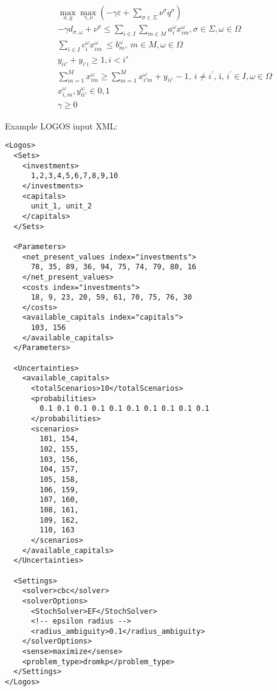\vst {}
\begin{subequations}\label{DROMKP}
\begin{eqnarray}
& & \max_{x, y} \max_{\gamma, \nu} (-\gamma \varepsilon + \sum_{\sigma \in \Sigma} \nu^\sigma q^\sigma)  \\
& &  -\gamma d_{\sigma, \omega} + \nu^\sigma \le \sum _{i \in I} \sum _{m \in M}a_{i}^{ \omega }x_{im}^{ \omega }, \sigma \in \Sigma, \omega \in \Omega \\
& & \sum _{i \in I}^{} c_{i}^{ \omega }x_{im}^{ \omega }~  \leq  b_{m}^{ \omega },~ m \in M,  \omega  \in  \Omega \\
& & y_{ii'} + y_{i'i} \geq 1, i<i'  \\
& & \sum_{m=1}^{M} x_{im}^\omega \geq \sum_{m=1}^{M} x_{i'm}^\omega + y_{ii'} -1,~ i \neq i^{'}\text{, i, }i^{'} \in I,  \omega  \in  \Omega \\
& & x_{i,m}^\omega, y_{ii'}^\omega \in {0, 1} \\
& & \gamma \ge 0
\end{eqnarray}
\end{subequations}

Example LOGOS input XML:
\begin{lstlisting}[style=XML]
<Logos>
  <Sets>
    <investments>
      1,2,3,4,5,6,7,8,9,10
    </investments>
    <capitals>
      unit_1, unit_2
    </capitals>
  </Sets>

  <Parameters>
    <net_present_values index="investments">
      78, 35, 89, 36, 94, 75, 74, 79, 80, 16
    </net_present_values>
    <costs index="investments">
      18, 9, 23, 20, 59, 61, 70, 75, 76, 30
    </costs>
    <available_capitals index="capitals">
      103, 156
    </available_capitals>
  </Parameters>

  <Uncertainties>
    <available_capitals>
      <totalScenarios>10</totalScenarios>
      <probabilities>
        0.1 0.1 0.1 0.1 0.1 0.1 0.1 0.1 0.1 0.1
      </probabilities>
      <scenarios>
        101, 154,
        102, 155,
        103, 156,
        104, 157,
        105, 158,
        106, 159,
        107, 160,
        108, 161,
        109, 162,
        110, 163
      </scenarios>
    </available_capitals>
  </Uncertainties>

  <Settings>
    <solver>cbc</solver>
    <solverOptions>
      <StochSolver>EF</StochSolver>
      <!-- epsilon radius -->
      <radius_ambiguity>0.1</radius_ambiguity>
    </solverOptions>
    <sense>maximize</sense>
    <problem_type>dromkp</problem_type>
  </Settings>
</Logos>
\end{lstlisting}


